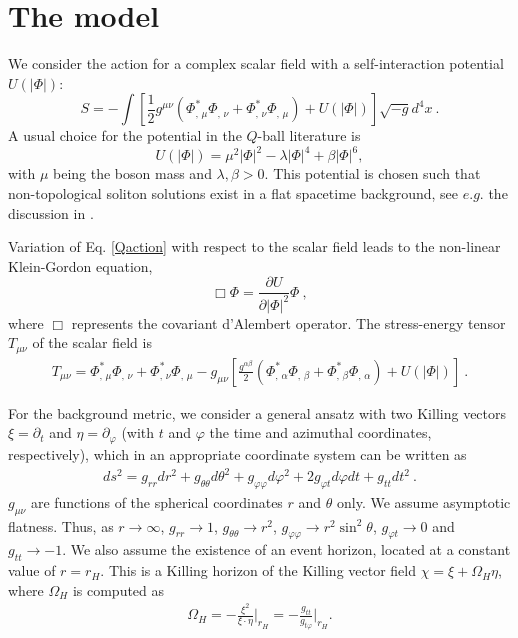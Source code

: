 \section{The model}



We consider the action for a complex scalar field with a self-interaction potential $U(\left| \Phi \right|)$:
\begin{equation}
\label{Qaction}
S=-\int \left[ 
   \frac{1}{2} g^{\mu\nu}\left( \Phi_{, \, \mu}^* \Phi_{, \, \nu} + \Phi _
{, \, \nu}^* \Phi _{, \, \mu} \right) + U( \left| \Phi \right|) 
 \right] \sqrt{-g} d^4x
\ . 
\end{equation}
A usual choice for the potential in the $Q$-ball literature is 
\begin{equation}
U(|\Phi|) =  \mu^2 |\Phi|^2-\lambda |\Phi|^4 +\beta |\Phi|^6,
\label{QU} 
\end{equation}
with $\mu$ being the boson mass and $\lambda,\beta>0$.
This potential is chosen such that non-topological soliton solutions
exist in a flat spacetime background, see $e.g.$ the discussion in \cite{Volkov:2002aj}.

Variation of Eq. \eqref{Qaction} with respect to the scalar field
leads to the non-linear Klein-Gordon equation,
\begin{equation}
\label{KG}
 \Box\Phi= \frac{\partial U}{\partial\left|\Phi\right|^2}\Phi \ ,
\end{equation}
where $\Box$ represents the covariant d'Alembert operator.
%
%
The stress-energy tensor $T_{\mu\nu}$ of the scalar field is
\begin{eqnarray}
T_{\mu \nu} 
=  \Phi_{, \, \mu}^*\Phi_{, \, \nu}
+\Phi_{, \, \nu}^*\Phi_{, \, \mu} -g_{\mu\nu} \left[ \frac{g^{\alpha\beta} }{2} 
\left( \Phi_{, \, \alpha}^*\Phi_{, \, \beta}+
\Phi_{, \, \beta}^*\Phi_{, \, \alpha} \right)+U(|\Phi|)\right]
 \ .
\label{tmunu} 
\end{eqnarray}

For the background metric,
we consider a general 
ansatz with two Killing vectors   $\xi=\partial_t$ and $\eta=\partial_\varphi$ (with $t$ and $\varphi$
the time and azimuthal coordinates, respectively),
which in an appropriate coordinate system
can be written as
\begin{eqnarray}
\label{metric-ansatz}
ds^2= g_{rr}dr^2+g_{\theta \theta} d\theta^2 +g_{\varphi\varphi}d\varphi^2+2 g_{\varphi t}d\varphi dt +g_{tt} dt^2 \ .
\end{eqnarray}
$g_{\mu\nu}$ 
are functions of the spherical coordinates $r$ and $\theta$ only. We assume asymptotic flatness. Thus, as $r\to \infty$, $g_{rr} \to 1$,
$g_{\theta \theta} \to r^2$,
$g_{\varphi\varphi} \to r^2\sin^2 \theta$,
$g_{\varphi t} \to 0$
and
$g_{tt} \to -1$.
We also assume the existence of an event horizon, located
at a constant value of $r=r_H$.
This 
is a Killing horizon of the Killing vector field
$\chi=\xi+\Omega_H \eta$,
where $\Omega_H$ is computed as
\begin{eqnarray}
\label{OmegaH}
\Omega_H=-\frac{\xi^2}{\xi \cdot \eta}\bigg |_{r_H}=-\frac{g_{tt}}{g_{t\varphi}}\bigg |_{r_H}.
\end{eqnarray}

